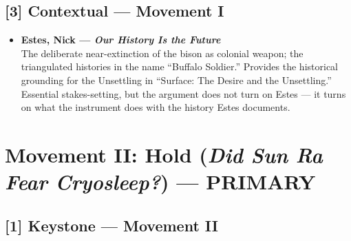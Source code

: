 \subsection*{[3] Contextual — Movement I}

\begin{itemize}

    \item \textbf{Estes, Nick — \textit{Our History Is the Future}} \parencite{Estes_2019}\\
    The deliberate near-extinction of the bison as colonial weapon; the triangulated histories in the name ``Buffalo Soldier.'' Provides the historical grounding for the Unsettling in ``Surface: The Desire and the Unsettling.'' Essential stakes-setting, but the argument does not turn on Estes — it turns on what the instrument does with the history Estes documents.

\end{itemize}

\bigskip


\section*{Movement II: Hold (\textit{Did Sun Ra Fear Cryosleep?}) --- PRIMARY}


\subsection*{[1] Keystone — Movement II}


